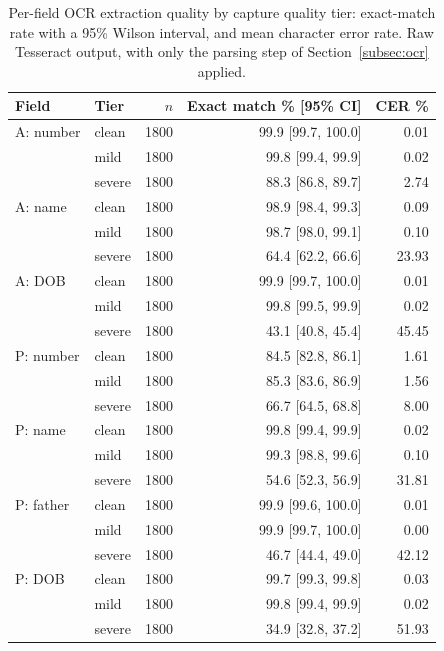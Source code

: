 \begin{table}[t]
\caption{Per-field OCR extraction quality by capture quality tier:
exact-match rate with a 95\% Wilson interval, and mean character
error rate. Raw Tesseract output, with only the parsing step of
Section~\ref{subsec:ocr} applied.}
\label{tab:ocr}
\centering
\footnotesize
\begin{tabular}{@{}llrrr@{}}
\toprule
Field & Tier & $n$ & Exact match \% [95\% CI] & CER \% \\
\midrule
A: number & clean & 1800 & 99.9 [99.7, 100.0] & 0.01 \\
 & mild & 1800 & 99.8 [99.4, 99.9] & 0.02 \\
 & severe & 1800 & 88.3 [86.8, 89.7] & 2.74 \\
\addlinespace[1.5pt]
A: name & clean & 1800 & 98.9 [98.4, 99.3] & 0.09 \\
 & mild & 1800 & 98.7 [98.0, 99.1] & 0.10 \\
 & severe & 1800 & 64.4 [62.2, 66.6] & 23.93 \\
\addlinespace[1.5pt]
A: DOB & clean & 1800 & 99.9 [99.7, 100.0] & 0.01 \\
 & mild & 1800 & 99.8 [99.5, 99.9] & 0.02 \\
 & severe & 1800 & 43.1 [40.8, 45.4] & 45.45 \\
\addlinespace[1.5pt]
P: number & clean & 1800 & 84.5 [82.8, 86.1] & 1.61 \\
 & mild & 1800 & 85.3 [83.6, 86.9] & 1.56 \\
 & severe & 1800 & 66.7 [64.5, 68.8] & 8.00 \\
\addlinespace[1.5pt]
P: name & clean & 1800 & 99.8 [99.4, 99.9] & 0.02 \\
 & mild & 1800 & 99.3 [98.8, 99.6] & 0.10 \\
 & severe & 1800 & 54.6 [52.3, 56.9] & 31.81 \\
\addlinespace[1.5pt]
P: father & clean & 1800 & 99.9 [99.6, 100.0] & 0.01 \\
 & mild & 1800 & 99.9 [99.7, 100.0] & 0.00 \\
 & severe & 1800 & 46.7 [44.4, 49.0] & 42.12 \\
\addlinespace[1.5pt]
P: DOB & clean & 1800 & 99.7 [99.3, 99.8] & 0.03 \\
 & mild & 1800 & 99.8 [99.4, 99.9] & 0.02 \\
 & severe & 1800 & 34.9 [32.8, 37.2] & 51.93 \\
\bottomrule
\end{tabular}
\end{table}
